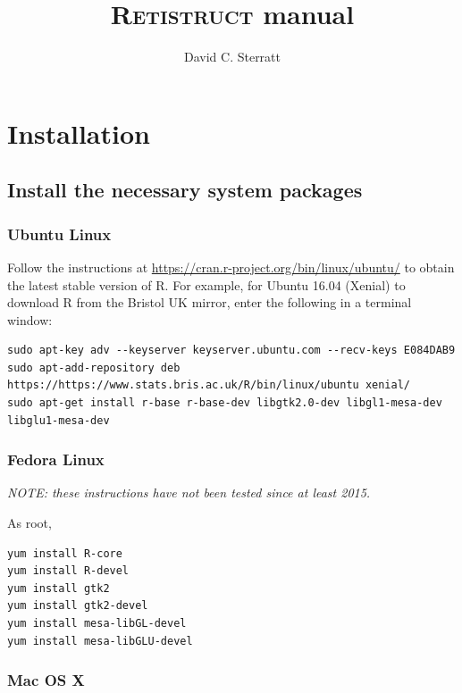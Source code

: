 \documentclass{book}
\title{\textsc{Retistruct} manual}
\author{David C. Sterratt}
\begin{document}
\maketitle
\thispagestyle{myheadings}

\tableofcontents

\chapter{Installation}
\label{manual:sec:installation}

\section{Install the necessary system packages}

\subsection{Ubuntu Linux}

Follow the instructions at
\url{https://cran.r-project.org/bin/linux/ubuntu/}
to obtain the latest stable version of R. For example, for Ubuntu
16.04 (Xenial) to download R from the Bristol UK mirror, enter the
following in a terminal window:
\begin{verbatim}
sudo apt-key adv --keyserver keyserver.ubuntu.com --recv-keys E084DAB9
sudo apt-add-repository deb https://https://www.stats.bris.ac.uk/R/bin/linux/ubuntu xenial/
sudo apt-get install r-base r-base-dev libgtk2.0-dev libgl1-mesa-dev libglu1-mesa-dev
\end{verbatim}

\subsection{Fedora Linux }

\emph{NOTE: these instructions have not been tested since at least
  2015.}

As root,

\begin{verbatim}
yum install R-core
yum install R-devel
yum install gtk2
yum install gtk2-devel
yum install mesa-libGL-devel
yum install mesa-libGLU-devel
\end{verbatim}


\subsection{Mac OS X}
\label{retistruct-manual:sec:mac}
\end{document}
